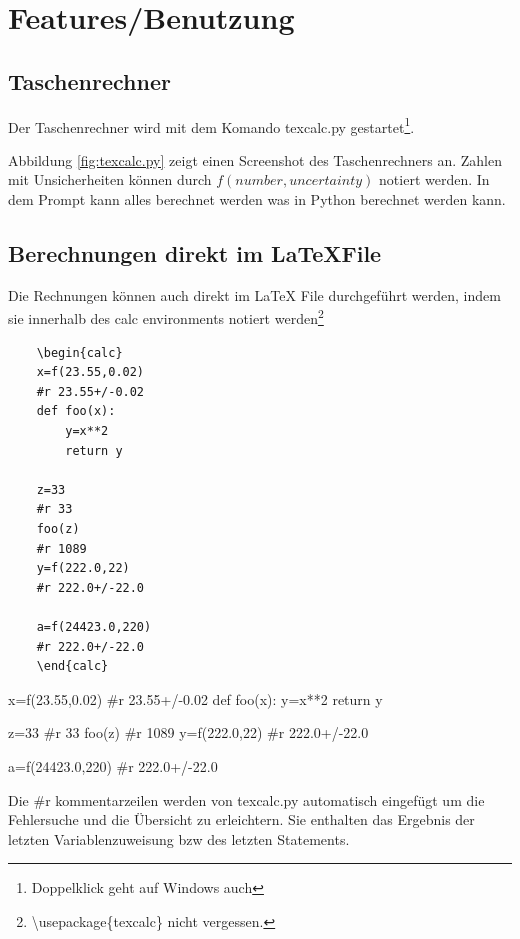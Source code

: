 \documentclass[a4paper]{article}
\begin{document}
\tableofcontents

\section{Features/Benutzung}

\subsection{Taschenrechner}

Der Taschenrechner wird mit dem Komando texcalc.py gestartet\footnote{Doppelklick geht auf Windows auch}.

Abbildung \ref{fig:texcalc.py} zeigt einen Screenshot des Taschenrechners an. Zahlen mit Unsicherheiten können 
durch $f(number, uncertainty)$ notiert werden. In dem Prompt kann alles berechnet werden was in Python berechnet 
werden kann. \\

\subsection{Berechnungen direkt im \LaTeX File}

Die Rechnungen können auch direkt im LaTeX File durchgeführt werden, indem sie innerhalb des calc environments 
notiert werden\footnote{\textbackslash usepackage\{texcalc\} nicht vergessen.} 

\begin{verbatim}
	\begin{calc}
	x=f(23.55,0.02)
	#r 23.55+/-0.02
	def foo(x):
		y=x**2
		return y
	
	z=33
	#r 33
	foo(z)
	#r 1089
	y=f(222.0,22)
	#r 222.0+/-22.0
	
	a=f(24423.0,220)
	#r 222.0+/-22.0
	\end{calc}
\end{verbatim}
	
\begin{calc}
x=f(23.55,0.02)
#r 23.55+/-0.02
def foo(x):
	y=x**2
	return y

z=33
#r 33
foo(z)
#r 1089
y=f(222.0,22)
#r 222.0+/-22.0

a=f(24423.0,220)
#r 222.0+/-22.0
\end{calc}

Die \#r kommentarzeilen werden von texcalc.py automatisch eingefügt um die Fehlersuche und die Übersicht zu erleichtern. 
Sie enthalten das Ergebnis der letzten Variablenzuweisung bzw des letzten Statements. \\
\end{document}
